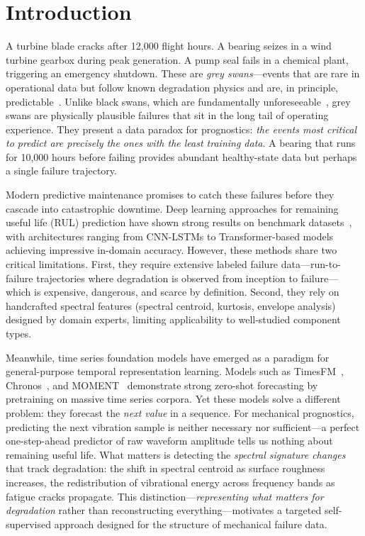 \section{Introduction}
\label{sec:intro}

A turbine blade cracks after 12,000 flight hours. A bearing seizes in a wind turbine gearbox during peak generation. A pump seal fails in a chemical plant, triggering an emergency shutdown. These are \emph{grey swans}---events that are rare in operational data but follow known degradation physics and are, in principle, predictable~\citep{greyswan_supplychain2025}. Unlike black swans, which are fundamentally unforeseeable~\citep{taleb2007blackswan}, grey swans are physically plausible failures that sit in the long tail of operating experience. They present a data paradox for prognostics: \emph{the events most critical to predict are precisely the ones with the least training data}. A bearing that runs for 10,000 hours before failing provides abundant healthy-state data but perhaps a single failure trajectory.

Modern predictive maintenance promises to catch these failures before they cascade into catastrophic downtime. Deep learning approaches for remaining useful life (RUL) prediction have shown strong results on benchmark datasets~\citep{lei2018machinery, zhao2019deeplearningphm}, with architectures ranging from CNN-LSTMs to Transformer-based models achieving impressive in-domain accuracy. However, these methods share two critical limitations. First, they require extensive labeled failure data---run-to-failure trajectories where degradation is observed from inception to failure---which is expensive, dangerous, and scarce by definition. Second, they rely on handcrafted spectral features (spectral centroid, kurtosis, envelope analysis) designed by domain experts, limiting applicability to well-studied component types.

Meanwhile, time series foundation models have emerged as a paradigm for general-purpose temporal representation learning. Models such as TimesFM~\citep{das2024timesfm}, Chronos~\citep{ansari2024chronos}, and MOMENT~\citep{goswami2024moment} demonstrate strong zero-shot forecasting by pretraining on massive time series corpora. Yet these models solve a different problem: they forecast the \emph{next value} in a sequence. For mechanical prognostics, predicting the next vibration sample is neither necessary nor sufficient---a perfect one-step-ahead predictor of raw waveform amplitude tells us nothing about remaining useful life. What matters is detecting the \emph{spectral signature changes} that track degradation: the shift in spectral centroid as surface roughness increases, the redistribution of vibrational energy across frequency bands as fatigue cracks propagate. This distinction---\emph{representing what matters for degradation} rather than reconstructing everything---motivates a targeted self-supervised approach designed for the structure of mechanical failure data.

